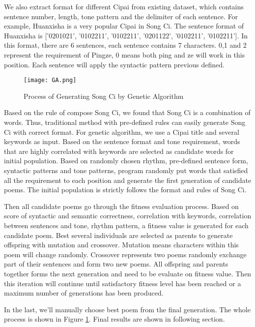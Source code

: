 We also extract format for different Cipai from existing dataset, which contains sentence number, length, tone pattern and the delimiter of each sentence.
%
For example, Huanxisha is a very popular Cipai in Song Ci.
%
The sentence format of Huanxisha is ['0201021', '0102211', '0102211', '0201122', '0102211', '0102211'].
%
In this format, there are 6 sentences, each sentence contains 7 characters.
%
0,1 and 2 represent the requirement of Pingze, 0 means both ping and ze will work in this position.
%
Each sentence will apply the syntactic pattern previous defined.


\begin{figure}[htbp]
	\centering
	\texttt{[image: GA.png]}
	\caption{Process of Generating Song Ci by Genetic Algorithm}
	\label{fig:GA}
\end{figure}


Based on the rule of compose Song Ci, we found that Song Ci is a combination of words.
%
Thus, traditional method with pre-defined rules can easily generate Song Ci with correct format.
%
For genetic algorithm, we use a Cipai title and several keywords as input.
%
Based on the sentence format and tone requirement, words that are highly correlated with keywords are selected as candidate words for initial population.
%
Based on randomly chosen rhythm, pre-defined sentence form, syntactic patterns and tone patterns, program randomly put words that satisfied all the requirement to each position and generate the first generation of candidate poems.
%
The initial population is strictly follows the format and rules of Song Ci.


Then all candidate poems go through the fitness evaluation process.
%
Based on score of syntactic and semantic correctness, correlation with keywords, correlation between sentences and tone, rhythm pattern, a fitness value is generated for each candidate poem.
%
Best several individuals are selected as parents to generate offspring with mutation and crossover.
%
Mutation means characters within this poem will change randomly.
%
Crossover represents two poems randomly exchange part of their sentences and form two new poems.
%
All offspring and parents together forms the next generation and need to be evaluate on fitness value.
%
Then this iteration will continue until satisfactory fitness level has been reached or a maximum number of generations has been produced.


In the last, we'll manually choose best poem from the final generation.
%
The whole process is shown in Figure \ref{fig:GA}.
%
Final results are shown in following section.


